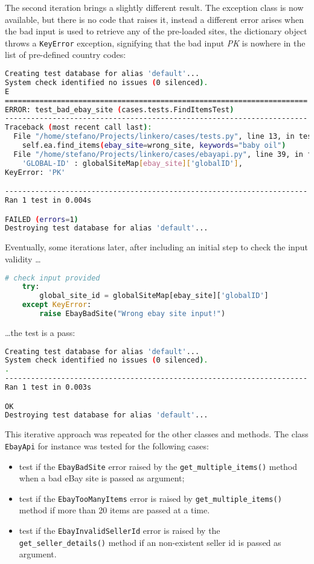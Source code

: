 The second iteration brings a slightly different result. The exception class is
now available, but there is no code that raises it, instead a different error
arises when the bad input is used to retrieve any of the pre-loaded sites, the
dictionary object throws a \texttt{KeyError} exception, signifying that the
bad input \emph{PK} is nowhere in the list of pre-defined country codes:
\begin{lstlisting}[language=bash, breaklines=true]
Creating test database for alias 'default'...
System check identified no issues (0 silenced).
E
======================================================================
ERROR: test_bad_ebay_site (cases.tests.FindItemsTest)
----------------------------------------------------------------------
Traceback (most recent call last):
  File "/home/stefano/Projects/linkero/cases/tests.py", line 13, in test_bad_ebay_site
    self.ea.find_items(ebay_site=wrong_site, keywords="baby oil")
  File "/home/stefano/Projects/linkero/cases/ebayapi.py", line 39, in find_items
    'GLOBAL-ID' : globalSiteMap[ebay_site]['globalID'],
KeyError: 'PK'

----------------------------------------------------------------------
Ran 1 test in 0.004s

FAILED (errors=1)
Destroying test database for alias 'default'...
\end{lstlisting}

Eventually, some iterations later, after including an initial step to check the
input validity \ldots
\begin{lstlisting}[language=Python, breaklines=true]
    # check input provided
    try:
        global_site_id = globalSiteMap[ebay_site]['globalID']
    except KeyError:
        raise EbayBadSite("Wrong ebay site input!")
\end{lstlisting}

\ldots the test is a pass:
\begin{lstlisting}[language=bash, breaklines=true]
Creating test database for alias 'default'...
System check identified no issues (0 silenced).
.
----------------------------------------------------------------------
Ran 1 test in 0.003s

OK
Destroying test database for alias 'default'...
\end{lstlisting}

This iterative approach was repeated for the other classes and methods. The
class \texttt{EbayApi} for instance was tested for the following cases:
\begin{itemize}
  \item test if the \texttt{EbayBadSite} error raised by the
  \texttt{get\_multiple\_items()} method when a bad eBay site is passed as
  argument;
  \item test if the \texttt{EbayTooManyItems} error is raised by
  \texttt{get\_multiple\_items()} method if more than 20 items are passed at a
  time.
  \item test if the \texttt{EbayInvalidSellerId} error is raised by the
  \texttt{get\_seller\_details()} method if an non-existent seller id is passed as
  argument.
\end{itemize}

